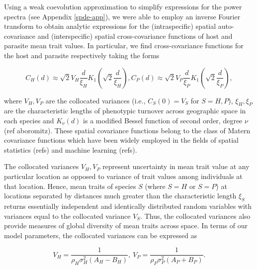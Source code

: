 \documentclass{article}
\begin{document}
Using a weak coevolution approximation to simplify expressions for the
power spectra (see Appendix \ref{spde-app}), we were able to employ an
inverse Fourier transform to obtain analytic expressions for the
(intraspecific) spatial auto-covariance and (interspecific) spatial
cross-covariance functions of host and parasite mean trait values. In
particular, we find cross-covariance functions for the host and parasite
respectively taking the forms

\begin{subequations}
  \begin{equation}
    C_H(d)\approx\sqrt2V_H\frac{d}{\xi_H}K_1\left(\sqrt2\frac{d}{\xi_H}\right),
  \end{equation}
  \begin{equation}
    C_P(d)\approx\sqrt2V_P\frac{d}{\xi_P}K_1\left(\sqrt2\frac{d}{\xi_P}\right),
  \end{equation}
\end{subequations}

where \(V_H,V_P\) are the collocated variances (i.e., \(C_S(0)=V_S\) for
\(S=H,P\)), \(\xi_H,\xi_P\) are the characteristic lengths of phenotypic
turnover across geographic space in each species and \(K_\nu(d)\) is a
modified Bessel function of second order, degree \(\nu\) (ref
aboromitz). These spatial covariance functions belong to the class of
Matern covariance functions which have been widely employed in the
fields of spatial statistics (refs) and machine learning (refs).

The collocated variances \(V_H,V_P\) represent uncertainty in mean trait
value at any particular location as opposed to variance of trait values
among individuals at that location. Hence, mean traits of species \(S\)
(where \(S=H\) or \(S=P\)) at locations separated by distances much
greater than the characteristic length \(\xi_S\) returns essentially
independent and identically distributed random variables with variances
equal to the collocated variance \(V_S\). Thus, the collocated variances
also provide measures of global diversity of mean traits across space.
In terms of our model parameters, the collocated variances can be
expressed as

\begin{equation}
  V_H = \frac{1}{\rho_H\sigma_H^2(A_H-B_H)}, \ V_P = \frac{1}{\rho_P\sigma_P^2(A_P+B_P)}.
\end{equation}
\end{document}
